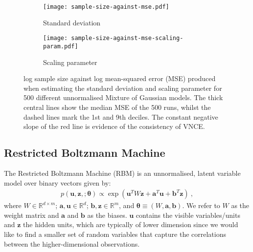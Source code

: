 \documentclass[11pt, oneside]{article}
\newcommand{\thetab}{{\boldsymbol{\theta}}}
\renewcommand{\u}{{\mathbf u}}
\newcommand{\z}{{\mathbf z}}
\theoremstyle{definition}
\begin{document}
\begin{figure}[t]
\centering
\begin{subfigure}{.5\textwidth}
  \centering
  \texttt{[image: sample-size-against-mse.pdf]}
  \caption{Standard deviation}
  \label{fig:sub1}
\end{subfigure}%
\begin{subfigure}{.5\textwidth}
  \centering
  \texttt{[image: sample-size-against-mse-scaling-param.pdf]}
  \caption{Scaling parameter}
  \label{fig:sub2}
\end{subfigure}
\caption{log sample size against log mean-squared error (MSE) produced when estimating the standard deviation and scaling parameter for 500 different unnormalised Mixture of Gaussian models. The thick central lines show the median MSE of the 500 runs, whilst the dashed lines mark the 1st and 9th deciles. The constant negative slope of the red line is evidence of the consistency of VNCE.}
\label{fig:mse-mog}
\end{figure}

\subsection{Restricted Boltzmann Machine}
\label{sec:rbm}

The Restricted Boltzmann Machine (RBM) \citep{smolensky1986information} is an unnormalised, latent variable model over binary vectors given by:
\begin{align}
p(\u, \z, ; \thetab)  \propto \exp(\u^TW\z + \textbf{a}^{T}\u + \textbf{b}^T\z) \ ,
\label{eq:rbm}
\end{align}
where $W \in \mathbb{R}^{d \times m}$; $\textbf{a}, \u \in \mathbb{R}^{d}$; $\textbf{b}, \z \in \mathbb{R}^{m}$, and $\thetab \equiv (W, \textbf{a}, \textbf{b})$. We refer to $W$ as the weight matrix and $\textbf{a}$ and $\textbf{b}$ as the biases. $\u$ contains the visible variables/units and $\z$ the hidden units, which are typically of lower dimension since we would like to find a smaller set of random variables that capture the correlations between the higher-dimensional observations.
\end{document}
